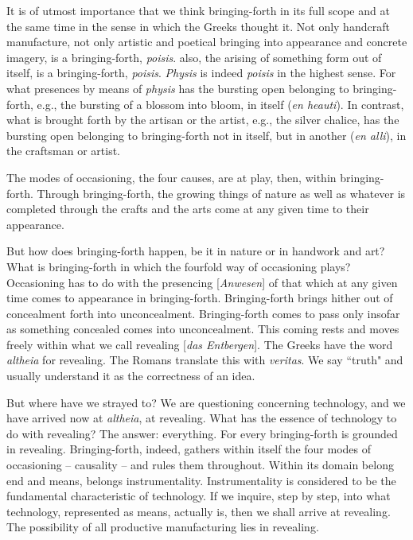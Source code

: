 It is of utmost importance that we think bringing-forth in its full scope and at the same time in the sense in which the Greeks thought it. Not only handcraft manufacture, not only artistic and poetical bringing into appearance and concrete imagery, is a bringing-forth, \textit{poisis}.  also, the arising of something form out of itself, is a bringing-forth, \textit{poisis}. \textit{Physis} is indeed \textit{poisis} in the highest sense. For what presences by means of \textit{physis} has the bursting open belonging to bringing-forth, e.g., the bursting of a blossom into bloom, in itself (\textit{en heauti}). In contrast, what is brought forth by the artisan or the artist, e.g., the silver chalice, has the bursting open belonging to bringing-forth not in itself, but in another (\textit{en alli}), in the craftsman or artist.

The modes of occasioning, the four causes, are at play, then, within bringing-forth. Through bringing-forth, the growing things of nature as well as whatever is completed through the crafts and the arts come at any given time to their appearance.

But how does bringing-forth happen, be it in nature or in handwork and art? What is bringing-forth in which the fourfold way of occasioning plays? Occasioning has to do with the presencing [\textit{Anwesen}] of that which at any given time comes to appearance in bringing-forth. Bringing-forth brings hither out of concealment forth into unconcealment. Bringing-forth comes to pass only insofar as something concealed comes into unconcealment. This coming rests and moves freely within what we call revealing [\textit{das Entbergen}]. The Greeks have the word \textit{altheia} for revealing. The Romans translate this with \textit{veritas}. We say ``truth" and usually understand it as the correctness of an idea.



But where have we strayed to? We are questioning concerning technology, and we have arrived now at \textit{altheia}, at revealing. What has the essence of technology to do with revealing? The answer: everything. For every bringing-forth is grounded in revealing. Bringing-forth, indeed, gathers within itself the four modes of occasioning -- causality -- and rules them throughout. Within its domain belong end and means, belongs instrumentality. Instrumentality is considered to be the fundamental characteristic of technology. If we inquire, step by step, into what technology, represented as means, actually is, then we shall arrive at revealing. The possibility of all productive manufacturing lies in revealing.

